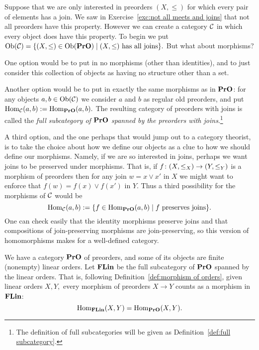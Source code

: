 \documentclass[../main/CT4S-EN-RU]{subfiles}
\begin{document}
\begin{exampleENG}\label{ex:preorders with joins}
Suppose that we are only interested in preorders $(X,\leq)$ for which every pair of elements has a join. We saw in Exercise~\ref{exc:not all meets and joins} that not all preorders have this property. However we can create a category $\mathcal{C}$ in which every object does have this property. To begin we put $\operatorname{Ob}(\mathcal{C})=\{(X,\leq)\in\operatorname{Ob}({\mathbf{PrO}}){\;|\;} (X,\leq)\textnormal{ has all joins}\}.$ But what about morphisms?

One option would be to put in no morphisms (other than identities), and to just consider this collection of objects as having no structure other than a set.

Another option would be to put in exactly the same morphisms as in ${\mathbf{PrO}}$: for any objects $a,b\in\operatorname{Ob}(\mathcal{C})$ we consider $a$ and $b$ as regular old preorders, and put $\operatorname{Hom}_\mathcal{C}(a,b):=\operatorname{Hom}_{{\mathbf{PrO}}}(a,b).$ The resulting category of preorders with joins is called the {\em full subcategory of ${\mathbf{PrO}}$ spanned by the preorders with joins}.\footnote{The definition of full subcategories will be given as Definition~\ref{def:full subcategory}.}

A third option, and the one perhaps that would jump out to a category theorist, is to take the choice about how we define our objects as a clue to how we should define our morphisms. Namely, if we are so interested in joins, perhaps we want joins to be preserved under morphisms. That is, if $f\colon (X,\leq_X)\rightarrow (Y,\leq_Y)$ is a morphism of preorders then for any join $w=x\vee x'$ in $X$ we might want to enforce that $f(w)=f(x)\vee f(x')$ in $Y.$ Thus a third possibility for the morphisms of $\mathcal{C}$ would be $$\operatorname{Hom}_\mathcal{C}(a,b):=\{f\in\operatorname{Hom}_{{\mathbf{PrO}}}(a,b){\;|\;}f \textnormal{ preserves joins}\}.$$ One can check easily that the identity morphisms preserve joins and that compositions of join-preserving morphisms are join-preserving, so this version of homomorphisms makes for a well-defined category.
\end{exampleENG}

\begin{exampleRUS}\label{ex:preorders with joins}
\end{exampleRUS}

\begin{exampleENG}\label{ex:FLin}
We have a category ${\mathbf{PrO}}$ of preorders, and some of its objects are finite (nonempty) linear orders. Let ${\mathbf{FLin}}$ be the full subcategory of ${\mathbf{PrO}}$ spanned by the linear orders. That is, following Definition~\ref{def:morphism of orders}, given linear orders $X,Y,$ every morphism of preorders $X\to Y$ counts as a morphism in ${\mathbf{FLin}}$: $$\operatorname{Hom}_{\mathbf{FLin}}(X,Y)=\operatorname{Hom}_{\mathbf{PrO}}(X,Y).$$ 
\end{exampleENG}
\end{document}
